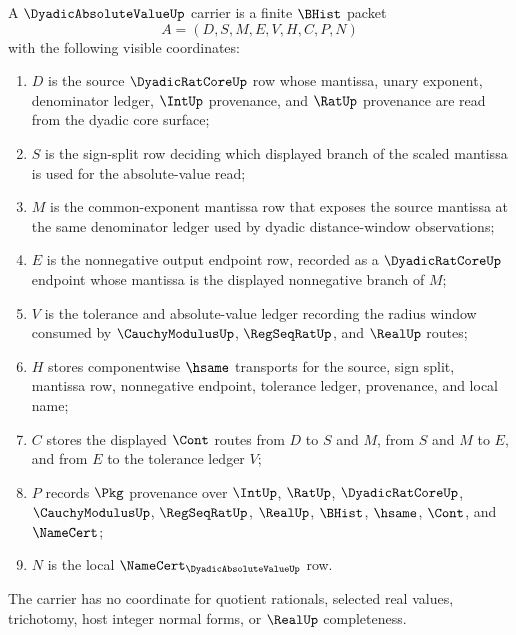 \begin{definition}
\label{def:dyadic-absolute-value-carrier}
A $\DyadicAbsoluteValueUp$ carrier is a finite $\BHist$ packet
$$
A=(D,S,M,E,V,H,C,P,N)
$$
with the following visible coordinates:
\begin{enumerate}
\item $D$ is the source $\DyadicRatCoreUp$ row whose mantissa, unary exponent, denominator ledger, $\IntUp$ provenance, and $\RatUp$ provenance are read from the dyadic core surface;
\item $S$ is the sign-split row deciding which displayed branch of the scaled mantissa is used for the absolute-value read;
\item $M$ is the common-exponent mantissa row that exposes the source mantissa at the same denominator ledger used by dyadic distance-window observations;
\item $E$ is the nonnegative output endpoint row, recorded as a $\DyadicRatCoreUp$ endpoint whose mantissa is the displayed nonnegative branch of $M$;
\item $V$ is the tolerance and absolute-value ledger recording the radius window consumed by $\CauchyModulusUp$, $\RegSeqRatUp$, and $\RealUp$ routes;
\item $H$ stores componentwise $\hsame$ transports for the source, sign split, mantissa row, nonnegative endpoint, tolerance ledger, provenance, and local name;
\item $C$ stores the displayed $\Cont$ routes from $D$ to $S$ and $M$, from $S$ and $M$ to $E$, and from $E$ to the tolerance ledger $V$;
\item $P$ records $\Pkg$ provenance over $\IntUp$, $\RatUp$, $\DyadicRatCoreUp$, $\CauchyModulusUp$, $\RegSeqRatUp$, $\RealUp$, $\BHist$, $\hsame$, $\Cont$, and $\NameCert$;
\item $N$ is the local $\NameCert_{\DyadicAbsoluteValueUp}$ row.
\end{enumerate}
The carrier has no coordinate for quotient rationals, selected real values, trichotomy, host integer normal forms, or $\RealUp$ completeness.
\end{definition}

